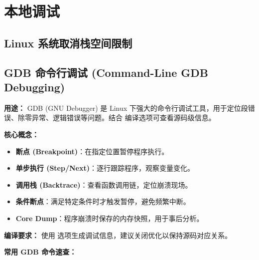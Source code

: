 \section{本地调试}

\subsection{Linux 系统取消栈空间限制}



\subsection{GDB 命令行调试 (Command-Line GDB Debugging)}

\textbf{用途：} GDB (GNU Debugger) 是 Linux 下强大的命令行调试工具，用于定位段错误、除零异常、逻辑错误等问题。结合  编译选项可查看源码级信息。

\textbf{核心概念：}
\begin{itemize}
  \item \textbf{断点 (Breakpoint)}：在指定位置暂停程序执行。
  \item \textbf{单步执行 (Step/Next)}：逐行跟踪程序，观察变量变化。
  \item \textbf{调用栈 (Backtrace)}：查看函数调用链，定位崩溃现场。
  \item \textbf{条件断点}：满足特定条件时才触发暂停，避免频繁中断。
  \item \textbf{Core Dump}：程序崩溃时保存的内存快照，用于事后分析。
\end{itemize}

\textbf{编译要求：} 使用  选项生成调试信息，建议关闭优化以保持源码对应关系。
\begin{quote}
\end{quote}

\textbf{常用 GDB 命令速查：}

